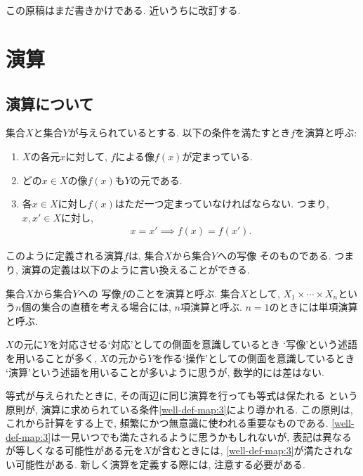 
\newcommand{\tofu}{{\bullet}}
\newcommand{\lxor}{\oplus}

\chapter*{}
この原稿はまだ書きかけである.
近いうちに改訂する.


\chapter{演算}
\section{演算について}
集合$X$と集合$Y$が与えられているとする.
以下の条件を満たすとき$f$を演算と呼ぶ:
\begin{enumerate}
 \item 
 \label{well-def-map:1}
 $X$の各元$x$に対して, $f$による像$f(x)$が定まっている.
 \item 
 \label{well-def-map:2}
 どの$x\in X$の像$f(x)$も$Y$の元である.
 \item 
\label{well-def-map:3}
各$x\in X$に対し$f(x)$はただ一つ定まっていなければならない.
つまり, $x,x'\in X$に対し,
 \begin{align*}
  x=x'\implies f(x)=f(x').
 \end{align*}
\end{enumerate}
このように定義される演算$f$は,
集合$X$から集合$Y$への写像
そのものである.
つまり, 演算の定義は以下のように言い換えることができる.
\begin{definition}
集合$X$から集合$Y$への
写像$f$のことを演算と呼ぶ.
集合$X$として, $X_1\times \cdots \times X_n$という$n$個の集合の直積を考える場合には,
$n$項演算と呼ぶ.
$n=1$のときには単項演算と呼ぶ.
\end{definition}
$X$の元に$Y$を対応させる`対応'としての側面を意識しているとき
`写像'という述語を用いることが多く,
$X$の元から$Y$を作る`操作'としての側面を意識しているとき
`演算'という述語を用いることが多いように思うが,
数学的には差はない.

等式が与えられたときに,
その両辺に同じ演算を行っても等式は保たれる
という原則が,
演算に求められている条件\cref{well-def-map:3}により導かれる.
この原則は,
これから計算をする上で,
頻繁にかつ無意識に使われる重要なものである.
\cref{well-def-map:3}は一見いつでも満たされるように思うかもしれないが,
表記は異なるが等しくなる可能性がある元を$X$が含むときには,
\cref{well-def-map:3}が満たされない可能性がある.
新しく演算を定義する際には,
注意する必要がある.

